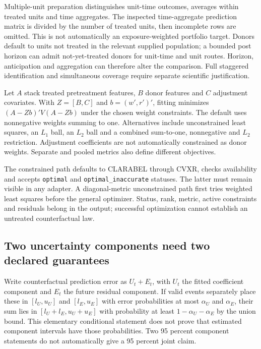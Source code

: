Multiple-unit preparation distinguishes unit-time outcomes, averages within
treated units and time aggregates. The inspected time-aggregate prediction
matrix is divided by the number of treated units, then incomplete rows are
omitted. This is not automatically an exposure-weighted portfolio target.
Donors default to units not treated in the relevant supplied population;
a bounded post horizon can admit not-yet-treated donors for unit-time and
unit routes. Horizon, anticipation and aggregation can therefore alter the
comparison. Full staggered identification and simultaneous coverage require
separate scientific justification.~\citep{exec24_scpi_source,exec24_scpi_choice}

Let $A$ stack treated pretreatment features, $B$ donor features and $C$
adjustment covariates. With $Z=[B,C]$ and $b=(w',r')'$, fitting minimizes
$(A-Zb)'V(A-Zb)$ under the chosen weight constraints. The default uses
nonnegative weights summing to one. Alternatives include unconstrained
least squares, an $L_1$ ball, an $L_2$ ball and a combined sum-to-one,
nonnegative and $L_2$ restriction. Adjustment coefficients are not
automatically constrained as donor weights. Separate and pooled metrics
also define different objectives.~\citep{exec24_scpi_source}

The constrained path defaults to CLARABEL through CVXR, checks availability
and accepts \texttt{optimal} and \texttt{optimal\_inaccurate} statuses. The
latter must remain visible in any adapter. A diagonal-metric unconstrained
path first tries weighted least squares before the general optimizer.
Status, rank, metric, active constraints and residuals belong in the output;
successful optimization cannot establish an untreated counterfactual law.
\citep{exec24_scpi_source,exec24_scpi_choice}

\subsection{Two uncertainty components need two declared guarantees}
Write counterfactual prediction error as $U_t+E_t$, with $U_t$ the fitted
coefficient component and $E_t$ the future residual component. If valid
events separately place these in $[l_U,u_U]$ and $[l_E,u_E]$ with error
probabilities at most $\alpha_U$ and $\alpha_E$, their sum lies in
$[l_U+l_E,u_U+u_E]$ with probability at least $1-\alpha_U-\alpha_E$ by
the union bound. This elementary conditional statement does not prove that
estimated component intervals have those probabilities. Two 95 percent
component statements do not automatically give a 95 percent joint claim.
\citep{exec24_scpi_choice}

